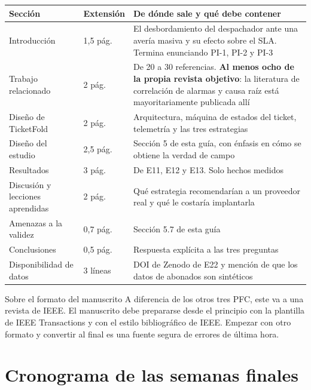 \documentclass[11pt,a4paper]{article}
\begin{document}
\begin{center}
	\small
	\begin{tabular}{@{}p{3.8cm}p{1.7cm}p{9.3cm}@{}}
		\toprule
		\textbf{Sección} & \textbf{Extensión} & \textbf{De dónde sale y qué debe contener} \\
		\midrule
		Introducción & 1,5 pág. & El desbordamiento del despachador ante una avería masiva y su efecto sobre el SLA. Termina enunciando PI-1, PI-2 y PI-3 \\
		\addlinespace
		Trabajo relacionado & 2 pág. & De 20 a 30 referencias. \textbf{Al menos ocho de la propia revista objetivo}: la literatura de correlación de alarmas y causa raíz está mayoritariamente publicada allí \\
		\addlinespace
		Diseño de TicketFold & 2 pág. & Arquitectura, máquina de estados del ticket, telemetría y las tres estrategias \\
		\addlinespace
		Diseño del estudio & 2,5 pág. & Sección 5 de esta guía, con énfasis en cómo se obtiene la verdad de campo \\
		\addlinespace
		Resultados & 3 pág. & De E11, E12 y E13. Solo hechos medidos \\
		\addlinespace
		Discusión y lecciones aprendidas & 2 pág. & Qué estrategia recomendarían a un proveedor real y qué le costaría implantarla \\
		\addlinespace
		Amenazas a la validez & 0,7 pág. & Sección 5.7 de esta guía \\
		\addlinespace
		Conclusiones & 0,5 pág. & Respuesta explícita a las tres preguntas \\
		\addlinespace
		Disponibilidad de datos & 3 líneas & DOI de Zenodo de E22 y mención de que los datos de abonados son sintéticos \\
		\bottomrule
	\end{tabular}
\end{center}

\begin{aviso}{Sobre el formato del manuscrito}
	A diferencia de los otros tres PFC, este va a una revista de IEEE. El manuscrito debe prepararse desde el principio con la plantilla de IEEE Transactions y con el estilo bibliográfico de IEEE. Empezar con otro formato y convertir al final es una fuente segura de errores de última hora.
\end{aviso}

\section{Cronograma de las semanas finales}
\end{document}
